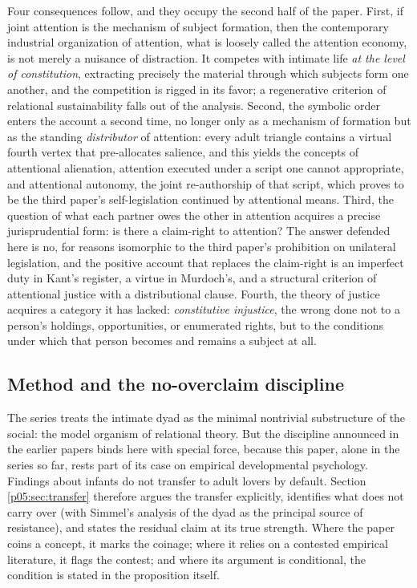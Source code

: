 \documentclass[11pt,a4paper]{article}
\theoremstyle{seriesthm}
\begin{document}
Four consequences follow, and they occupy the second half of the paper. First, if joint attention is the mechanism of subject formation, then the contemporary industrial organization of attention, what is loosely called the attention economy, is not merely a nuisance of distraction. It competes with intimate life \emph{at the level of constitution}, extracting precisely the material through which subjects form one another, and the competition is rigged in its favor; a regenerative criterion of relational sustainability falls out of the analysis. Second, the symbolic order enters the account a second time, no longer only as a mechanism of formation but as the standing \emph{distributor} of attention: every adult triangle contains a virtual fourth vertex that pre-allocates salience, and this yields the concepts of attentional alienation, attention executed under a script one cannot appropriate, and attentional autonomy, the joint re-authorship of that script, which proves to be the third paper's self-legislation continued by attentional means. Third, the question of what each partner owes the other in attention acquires a precise jurisprudential form: is there a claim-right to attention? The answer defended here is no, for reasons isomorphic to the third paper's prohibition on unilateral legislation, and the positive account that replaces the claim-right is an imperfect duty in Kant's register, a virtue in Murdoch's, and a structural criterion of attentional justice with a distributional clause. Fourth, the theory of justice acquires a category it has lacked: \emph{constitutive injustice}, the wrong done not to a person's holdings, opportunities, or enumerated rights, but to the conditions under which that person becomes and remains a subject at all.

\subsection{Method and the no-overclaim discipline}

The series treats the intimate dyad as the minimal nontrivial substructure of the social: the model organism of relational theory. But the discipline announced in the earlier papers binds here with special force, because this paper, alone in the series so far, rests part of its case on empirical developmental psychology. Findings about infants do not transfer to adult lovers by default. Section \ref{p05:sec:transfer} therefore argues the transfer explicitly, identifies what does not carry over (with Simmel's analysis of the dyad as the principal source of resistance), and states the residual claim at its true strength. Where the paper coins a concept, it marks the coinage; where it relies on a contested empirical literature, it flags the contest; and where its argument is conditional, the condition is stated in the proposition itself.
\end{document}
